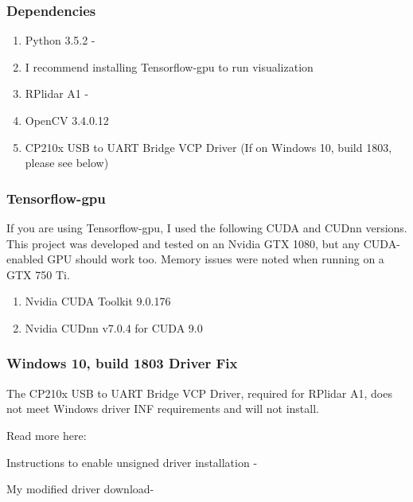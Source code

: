 \documentclass[onecolumn, draftclsnofoot,10pt, compsoc]{IEEEtran}
\begin{document}
\begin{singlespace}
		\subsubsection{Dependencies}
		\begin{enumerate}
			\item Python 3.5.2 - 
			\item I recommend installing Tensorflow-gpu to run visualization
				\subitem {}
			\item RPlidar A1 - 
				\subitem {}
			\item OpenCV 3.4.0.12
				\subitem {}
			\item CP210x USB to UART Bridge VCP Driver (If on Windows 10, build 1803, please see below)
				\subitem {}
		\end{enumerate}

		\subsubsection{Tensorflow-gpu}
		If you are using Tensorflow-gpu, I used the following CUDA and CUDnn versions.
		This project was developed and tested on an Nvidia GTX 1080, but any CUDA-enabled GPU should work too.
		Memory issues were noted when running on a GTX 750 Ti.
		\begin{enumerate}
			\item Nvidia CUDA Toolkit 9.0.176
			\item Nvidia CUDnn v7.0.4 for CUDA 9.0
		\end{enumerate}

		\subsubsection{Windows 10, build 1803 Driver Fix}
		The CP210x USB to UART Bridge VCP Driver, required for RPlidar A1, does not meet Windows driver INF requirements and will not install.

		Read more here: 

		Instructions to enable unsigned driver installation - 

		My modified driver download- 


\end{singlespace}
\end{document}
